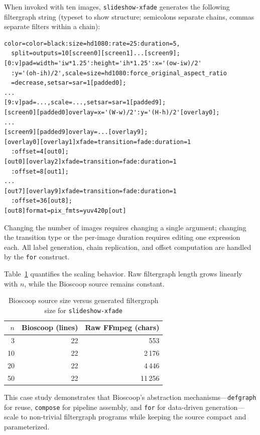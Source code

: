 \documentclass[english,submission]{programming}
\begin{document}
When invoked with ten images, \texttt{slideshow-xfade} generates the following filtergraph string (typeset to show structure; semicolons separate chains, commas separate filters within a chain):

\begin{lstlisting}[caption={Generated filtergraph for $n=10$ (excerpt)}]
color=color=black:size=hd1080:rate=25:duration=5,
  split=outputs=10[screen0][screen1]...[screen9];
[0:v]pad=width='iw*1.25':height='ih*1.25':x='(ow-iw)/2'
  :y='(oh-ih)/2',scale=size=hd1080:force_original_aspect_ratio
  =decrease,setsar=sar=1[padded0];
...
[9:v]pad=...,scale=...,setsar=sar=1[padded9];
[screen0][padded0]overlay=x='(W-w)/2':y='(H-h)/2'[overlay0];
...
[screen9][padded9]overlay=...[overlay9];
[overlay0][overlay1]xfade=transition=fade:duration=1
  :offset=4[out0];
[out0][overlay2]xfade=transition=fade:duration=1
  :offset=8[out1];
...
[out7][overlay9]xfade=transition=fade:duration=1
  :offset=36[out8];
[out8]format=pix_fmts=yuv420p[out]
\end{lstlisting}

Changing the number of images requires changing a single argument; changing the transition type or the per-image duration requires editing one expression each. All label generation, chain replication, and offset computation are handled by the \texttt{for} construct.

Table~\ref{tab:slideshow-scale} quantifies the scaling behavior. Raw filtergraph length grows linearly with $n$, while the Bioscoop source remains constant.

\begin{table}
\centering
\caption{Bioscoop source size versus generated filtergraph size for \texttt{slideshow-xfade}}
\label{tab:slideshow-scale}
\begin{tabular}{rrr}
\toprule
$n$ & Bioscoop (lines) & Raw FFmpeg (chars) \\
\midrule
 3 & 22 &    553 \\
10 & 22 &  2\,176 \\
20 & 22 &  4\,446 \\
50 & 22 & 11\,256 \\
\bottomrule
\end{tabular}
\end{table}

This case study demonstrates that Bioscoop's abstraction mechanisms---\texttt{defgraph} for reuse, \texttt{compose} for pipeline assembly, and \texttt{for} for data-driven generation---scale to non-trivial filtergraph programs while keeping the source compact and parameterized.
\end{document}
